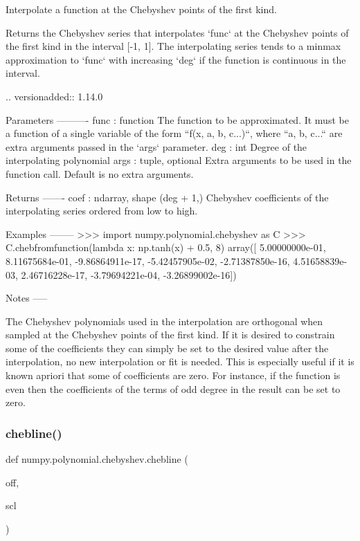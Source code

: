 \begin{DoxyVerb}Interpolate a function at the Chebyshev points of the first kind.

Returns the Chebyshev series that interpolates `func` at the Chebyshev
points of the first kind in the interval [-1, 1]. The interpolating
series tends to a minmax approximation to `func` with increasing `deg`
if the function is continuous in the interval.

.. versionadded:: 1.14.0

Parameters
----------
func : function
    The function to be approximated. It must be a function of a single
    variable of the form ``f(x, a, b, c...)``, where ``a, b, c...`` are
    extra arguments passed in the `args` parameter.
deg : int
    Degree of the interpolating polynomial
args : tuple, optional
    Extra arguments to be used in the function call. Default is no extra
    arguments.

Returns
-------
coef : ndarray, shape (deg + 1,)
    Chebyshev coefficients of the interpolating series ordered from low to
    high.

Examples
--------
>>> import numpy.polynomial.chebyshev as C
>>> C.chebfromfunction(lambda x: np.tanh(x) + 0.5, 8)
array([  5.00000000e-01,   8.11675684e-01,  -9.86864911e-17,
        -5.42457905e-02,  -2.71387850e-16,   4.51658839e-03,
         2.46716228e-17,  -3.79694221e-04,  -3.26899002e-16])

Notes
-----

The Chebyshev polynomials used in the interpolation are orthogonal when
sampled at the Chebyshev points of the first kind. If it is desired to
constrain some of the coefficients they can simply be set to the desired
value after the interpolation, no new interpolation or fit is needed. This
is especially useful if it is known apriori that some of coefficients are
zero. For instance, if the function is even then the coefficients of the
terms of odd degree in the result can be set to zero.\end{DoxyVerb}
 \mbox{\label{namespacenumpy_1_1polynomial_1_1chebyshev_abb7b73d1a72f6f6739660260618081c9}} 
\subsubsection{\texorpdfstring{chebline()}{chebline()}}
{\footnotesize\ttfamily def numpy.\+polynomial.\+chebyshev.\+chebline (\begin{DoxyParamCaption}\item[{}]{off,  }\item[{}]{scl }\end{DoxyParamCaption})}

